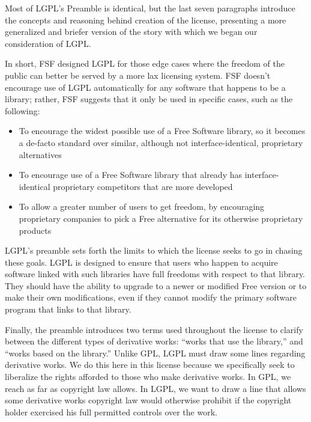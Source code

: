 Most of LGPL's Preamble is identical, but the last seven paragraphs
introduce the concepts and reasoning behind creation of the license,
presenting a more generalized and briefer version of the story with which
we began our consideration of LGPL\@.

In short, FSF designed LGPL for those edge cases where the freedom of the
public can better be served by a more lax licensing system. FSF doesn't
encourage use of LGPL automatically for any software that happens to be a
library; rather, FSF suggests that it only be used in specific cases, such
as the following:

\begin{itemize}

\item To encourage the widest possible use of a Free Software library, so
  it becomes a de-facto standard over similar, although not
  interface-identical, proprietary alternatives

\item To encourage use of a Free Software library that already has
  interface-identical proprietary competitors that are more developed

\item To allow a greater number of users to get freedom, by encouraging
  proprietary companies to pick a Free alternative for its otherwise
  proprietary products

\end{itemize}

LGPL's preamble sets forth the limits to which the license seeks to go in
chasing these goals. LGPL is designed to ensure that users who happen to
acquire software linked with such libraries have full freedoms with
respect to that library. They should have the ability to upgrade to a newer
or modified Free version or to make their own modifications, even if they
cannot modify the primary software program that links to that library.

Finally, the preamble introduces two terms used throughout the license to
clarify between the different types of derivative works: ``works that use
the library,'' and ``works based on the library.''  Unlike GPL, LGPL must
draw some lines regarding derivative works. We do this here in this
license because we specifically seek to liberalize the rights afforded to
those who make derivative works. In GPL, we reach as far as copyright law
allows. In LGPL, we want to draw a line that allows some derivative works
copyright law would otherwise prohibit if the copyright holder exercised
his full permitted controls over the work.

